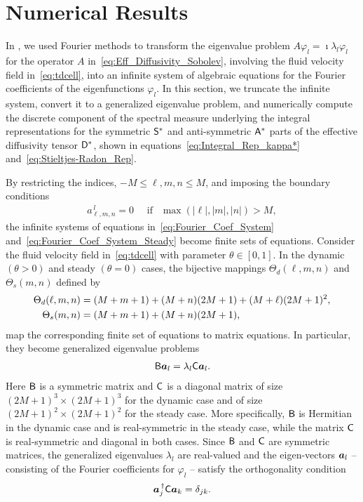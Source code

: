 \documentclass[amsa]{ipart}
\begin{document}
\section{Numerical Results}\label{sec:Num_Results}
%
In , we used Fourier methods to transform
the eigenvalue problem $A\varphi_l=\imath\lambda_l\varphi_l$ for the operator $A$
in~\eqref{eq:Eff_Diffusivity_Sobolev}, involving the fluid velocity field
in~\eqref{eq:tdcell}, into an infinite system of 
algebraic equations for the Fourier coefficients of the eigenfunctions
$\varphi_l$. In this section, we truncate the infinite
system, convert it to a generalized eigenvalue problem, and
numerically compute the discrete component of the spectral measure
underlying the integral representations for the symmetric
$\mathsf{S}^*$ and anti-symmetric $\mathsf{A}^*$ parts of the effective diffusivity
tensor $\mathsf{D}^*$, shown in equations~\eqref{eq:Integral_Rep_kappa*}
and~\eqref{eq:Stieltjes-Radon_Rep}. 




By restricting the indices, $-M\leq \ell,m,n\leq M$, and imposing the boundary
conditions
%
\begin{align}
  a^{\,l}_{\ell,m,n}=0 \quad \text{ if } \ \ \max(|\ell|,|m|,|n|)>M,
\end{align}
%
the infinite
systems of equations in~\eqref{eq:Fourier_Coef_System}
and~\eqref{eq:Fourier_Coef_System_Steady} become finite sets of
equations. Consider the fluid velocity field in~\eqref{eq:tdcell} with
parameter $\theta\in[0,1]$. In the dynamic $(\theta>0)$ and steady $(\theta=0)$ cases,
the bijective mappings $\Theta_d(\ell,m,n)$ and $\Theta_s(m,n)$ defined by
%
\begin{align}\label{eq:Bijections}
  \Theta_d(\ell,m,n)&=(M+m+1)+(M+n)(2M+1)+(M+\ell)(2M+1)^2,
  \\
  \Theta_s(m,n)&=(M+m+1)+(M+n)(2M+1),
  \notag
\end{align}
%
map the corresponding finite set of equations to matrix equations. In
particular, they become generalized eigenvalue problems 
%
\begin{align}\label{eq:Matrix_Equation}
  \Bm\veca_l=\lambda_l \Cm\veca_l.
\end{align}
%
Here $\mathsf{B}$ is a symmetric matrix and $\mathsf{C}$ is a diagonal matrix of size
$(2M+1)^3\times(2M+1)^3$ for the dynamic case and of size
$(2M+1)^2\times(2M+1)^2$ for the steady case. More specifically, $\mathsf{B}$ is
Hermitian in the dynamic case and is real-symmetric in the steady
case, while the matrix $\mathsf{C}$ is real-symmetric and diagonal in both
cases. Since $\mathsf{B}$ and $\mathsf{C}$ are symmetric matrices, the generalized
eigenvalues $\lambda_l$ are real-valued and the eigen-vectors $\boldsymbol{a}_l$ --
consisting of the Fourier coefficients for $\varphi_l$ -- satisfy the
orthogonality condition~\cite{Parlett:1980}  
%
\begin{align}\label{eq:Matrix_Ortho}
  \veca_j^{\,\dagger}\Cm\veca_k=\delta_{jk}.
\end{align}
%
\end{document}
